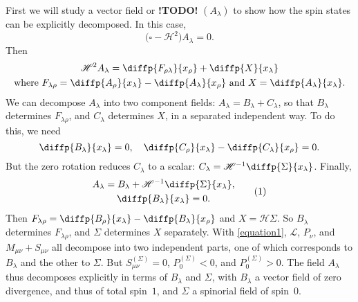 \documentclass{article}
\newcommand{\HH}{\mathscr{H}}
\newcommand{\LL}{\mathscr{L}}
\newcommand{\todo}{\textbf{ !TODO! }}
\newcommand{\oldpage}[1]{\marginpar{\footnotesize$\Big\vert$ \textit{p.~#1}}}
\begin{document}
\oldpage{13-03}
First we will study a vector field or \todo $(A_\lambda)$ to show how the spin states can be explicitly decomposed.
In this case,
\[
  \Big(\square-\HH^2\Big)A_\lambda = 0.
\]
Then
\begin{gather*}
  \HH^2 A_\lambda = \diffp{{F_{\rho\lambda}}}{{x_\rho}} + \diffp{X}{{x_\lambda}}
\\\mbox{where $F_{\lambda\rho} = \diffp{{A_\rho}}{{x_\lambda}} - \diffp{{A_\lambda}}{{x_\rho}}$ and $X = \diffp{{A_\lambda}}{{x_\lambda}}$.}
\end{gather*}
We can decompose $A_\lambda$ into two component fields: $A_\lambda=B_\lambda+C_\lambda$, so that $B_\lambda$ determines $F_{\lambda\rho}$, and $C_\lambda$ determines $X$, in a separated independent way.
To do this, we need
\[
  \diffp{{B_\lambda}}{{x_\lambda}} = 0,
  \quad
  \diffp{{C_\rho}}{{x_\lambda}} - \diffp{{C_\lambda}}{{x_\rho}} = 0.
\]
But the zero rotation reduces $C_\lambda$ to a scalar: $C_\lambda=\HH^{-1}\diffp{\Sigma}{{x_\lambda}}$.
Finally,
\[
\label{equation1}
  \begin{gathered}
    A_\lambda = B_\lambda + \HH^{-1}\diffp{\Sigma}{{x_\lambda}},
    \\\diffp{{B_\lambda}}{{x_\lambda}} = 0.
  \end{gathered}
  \tag{1}
\]
Then $F_{\lambda\rho}=\diffp{{B_\rho}}{{x_\lambda}}-\diffp{{B_\lambda}}{{x_\rho}}$ and $X=\HH\Sigma$.
So $B_\lambda$ determines $F_{\lambda\rho}$, and $\Sigma$ determines $X$ separately.
With \cref{equation1}, $\LL$, $P_\nu$, and $M_{\mu\nu}+S_{\mu\nu}$ all decompose into two independent parts, one of which corresponds to $B_\lambda$ and the other to $\Sigma$.
But $S_{\mu\nu}^{(\Sigma)}=0$, $P_0^{(\Sigma)}<0$, and $P_0^{(\Sigma)}>0$.
The field $A_\lambda$ thus decomposes explicitly in terms of $B_\lambda$ and $\Sigma$, with $B_\lambda$ a vector field of zero divergence, and thus of total spin~$1$, and $\Sigma$ a spinorial field of spin~$0$.

\medskip\hrulefill\bigskip
\end{document}
